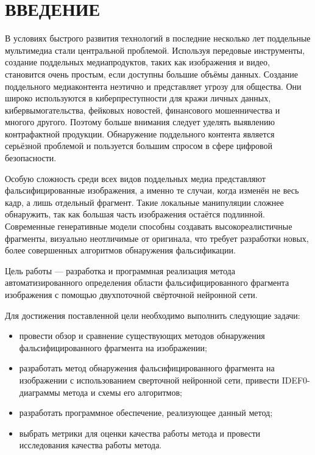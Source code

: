 \part*{ВВЕДЕНИЕ}
В условиях быстрого развития технологий в последние несколько лет поддельные мультимедиа стали центральной проблемой. Используя передовые инструменты, создание поддельных медиапродуктов, таких как изображения и видео, становится очень простым, если доступны большие объёмы данных. Создание поддельного медиаконтента неэтично и представляет угрозу для общества. Они широко используются в киберпреступности для кражи личных данных, кибервымогательства, фейковых новостей, финансового мошенничества и многого другого. Поэтому больше внимания следует уделять выявлению контрафактной продукции. Обнаружение поддельного контента является серьёзной проблемой и пользуется большим спросом в сфере цифровой безопасности.

Особую сложность среди всех видов поддельных медиа представляют фальсифицированные изображения, а именно те случаи, когда изменён не весь кадр, а лишь отдельный фрагмент. Такие локальные манипуляции сложнее обнаружить, так как большая часть изображения остаётся подлинной. Современные генеративные модели способны создавать высокореалистичные фрагменты, визуально неотличимые от оригинала, что требует разработки новых, более совершенных алгоритмов обнаружения фальсификации.

Цель работы --- разработка и программная реализация метода автоматизированного определения области фальсифицированного фрагмента изображения с помощью двухпоточной свёрточной нейронной сети.

Для достижения поставленной цели необходимо выполнить следующие задачи:
\begin{itemize}[label = ---]
    \item провести обзор и сравнение существующих методов обнаружения фальсифицированного фрагмента на изображении;
    \item разработать метод обнаружения фальсифицированного фрагмента на изображении с использованием сверточной нейронной сети, привести IDEF0-диаграммы метода и схемы его алгоритмов;
    \item разработать программное обеспечение, реализующее данный метод;
    \item выбрать метрики для оценки качества работы метода и провести исследования качества работы метода.
\end{itemize}